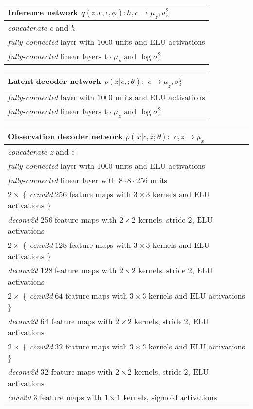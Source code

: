 \documentclass{article} \usepackage{iclr2017_conference,times}
\begin{document}
\begin{table}[H]

    \begin{tabular}{  l}
    \bf{Inference network} $q(z | x,c, \phi): h,c \to \mu_z, \sigma^2_z$ \\ \hline
    \emph{concatenate} $c$ and $h$ \\
    \emph{fully-connected} layer with $1000$ units and ELU activations\\
    \emph{fully-connected} linear layers to $\mu_z$ and $\log \sigma^2_z$
\label{table:faces_inference_network}
    \end{tabular}
\end{table}
\begin{table}[H]

    \begin{tabular}{  l}
    \bf{Latent decoder network} $p(z | c,; \theta):$ $c \to \mu_z, \sigma^2_z$ \\ \hline
    \emph{fully-connected} layer with $1000$ units and ELU activations\\
    \emph{fully-connected} linear layers to $\mu_z$ and $\log \sigma^2_z$
\label{table:faces_latent_decoder_network}
    \end{tabular}   
\end{table}

\begin{table}[H]

    \begin{tabular}{  l}
    \bf{Observation decoder network} $p(x | c, z ; \theta):$ $c,z \to \mu_x$ \\ \hline
    \emph{concatenate} $z$ and $c$ \\
    \emph{fully-connected} layer with $1000$ units and ELU activations \\
    \emph{fully-connected} linear layer with $8 \cdot 8 \cdot 256$ units \\
    $2 \times$ \{ \emph{conv2d} $256$ feature maps with $3 \times 3$ kernels and ELU activations \} \\
    \emph{deconv2d} $256$ feature maps with $2 \times 2$ kernels, stride 2, ELU activations \\
     $2 \times$ \{ \emph{conv2d} $128$ feature maps with $3 \times 3$ kernels and ELU activations \} \\
    \emph{deconv2d} $128$ feature maps with $2 \times 2$ kernels, stride 2, ELU activations \\   
    $2 \times$ \{ \emph{conv2d} $64$ feature maps with $3 \times 3$ kernels and ELU activations \} \\
    \emph{deconv2d} $64$ feature maps with $2 \times 2$ kernels, stride 2, ELU activations \\
     $2 \times$ \{ \emph{conv2d} $32$ feature maps with $3 \times 3$ kernels and ELU activations \} \\
    \emph{deconv2d} $32$ feature maps with $2 \times 2$ kernels, stride 2, ELU activations \\  
    \emph{conv2d} $3$ feature maps with $1 \times 1$ kernels, sigmoid activations
\label{table:faces_observation_decoder_network}
    \end{tabular}   
\end{table}
\end{document}
